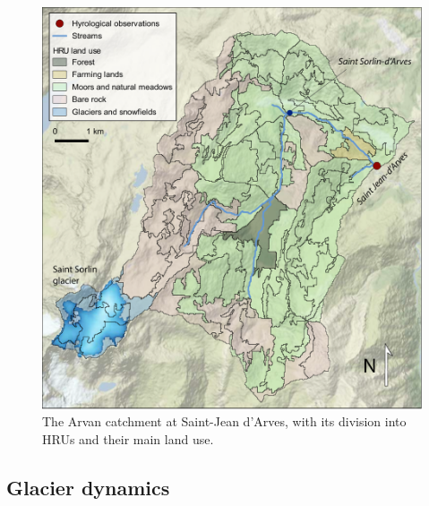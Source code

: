 \begin{figure}[h]
\centering
\includegraphics[width=12cm]{Figures/hydro/Figure_2.pdf}
\caption{The Arvan catchment at Saint-Jean d'Arves, with its division into HRUs and their main land use. } 
\label{hydro:fig2}
\end{figure}

\subsection{Glacier dynamics}

